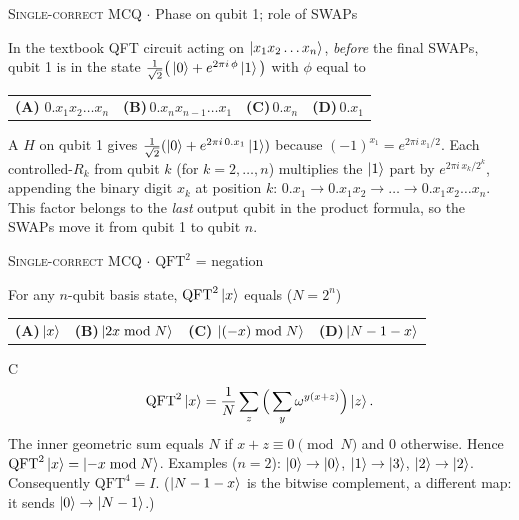 \documentclass[11pt,a4paper]{article}
\newcommand{\optlabel}[1]{\textbf{(#1)}}
\newcommand{\correctlabel}[1]{\textcolor{okgreen}{\textbf{(#1)}\,\ding{51}}}
\newenvironment{qitem}[1]{\begin{list}{}{\setlength{\leftmargin}{3.3em}\setlength{\labelwidth}{3.1em}%
  \setlength{\labelsep}{0.2em}\setlength{\topsep}{3pt}\setlength{\parsep}{3pt}}\item[\textbf{Q.#1}\hfill]}{\end{list}}
\newcommand{\qsep}{\par\vspace{2pt}{\color{black!15}\hrule}\vspace{4pt}}
\newcommand{\qmeta}[2]{{\footnotesize\color{black!60}\textsc{#1} \;$\cdot$\; #2}\par}
\begin{document}
\begin{qitem}{47}
\qmeta{Single-correct MCQ}{Phase on qubit 1; role of SWAPs}
In the textbook QFT circuit acting on $\ket{x_1x_2\dots x_n}$, \emph{before} the final SWAPs, qubit 1 is in the state
$\frac{1}{\sqrt2}\big(\ket0 + e^{2\pi i\,\phi}\ket1\big)$ with $\phi$ equal to
\par\smallskip\noindent\begin{tabularx}{\linewidth}{@{}*{4}{L}@{}}
\correctlabel{A}\,$0.x_1x_2\dots x_n$ & \optlabel{B}\,$0.x_nx_{n-1}\dots x_1$ & \optlabel{C}\,$0.x_n$ & \optlabel{D}\,$0.x_1$
\end{tabularx}
\end{qitem}
\begin{solbox}{A}
$H$ on qubit 1 gives $\frac{1}{\sqrt2}(\ket0 + e^{2\pi i\,0.x_1}\ket1)$ because $(-1)^{x_1} = e^{2\pi i\,x_1/2}$.
Each controlled-$R_k$ from qubit $k$ (for $k = 2, \dots, n$) multiplies the $\ket1$ part by $e^{2\pi i\,x_k/2^k}$, appending the
binary digit $x_k$ at position $k$: $0.x_1 \to 0.x_1x_2 \to \dots \to 0.x_1x_2\dots x_n$.
This factor belongs to the \emph{last} output qubit in the product formula, so the SWAPs move it from qubit 1 to qubit $n$.
\end{solbox}
\qsep

\begin{qitem}{48}
\qmeta{Single-correct MCQ}{$\mathrm{QFT}^2$ = negation}
For any $n$-qubit basis state, $\mathrm{QFT}^2\ket{x}$ equals ($N = 2^n$)
\par\smallskip\noindent\begin{tabularx}{\linewidth}{@{}*{4}{L}@{}}
\optlabel{A}\,$\ket{x}$ & \optlabel{B}\,$\ket{2x \bmod N}$ & \correctlabel{C}\,$\ket{(-x) \bmod N}$ & \optlabel{D}\,$\ket{N - 1 - x}$
\end{tabularx}
\end{qitem}
\begin{solbox}{C}
\[ \mathrm{QFT}^2\ket x = \frac{1}{N}\sum_{z}\Big(\sum_y \omega^{y(x+z)}\Big)\ket z . \]
The inner geometric sum equals $N$ if $x + z \equiv 0 \pmod N$ and $0$ otherwise. Hence $\mathrm{QFT}^2\ket x = \ket{-x \bmod N}$.
Examples ($n = 2$): $\ket0 \to \ket0$, $\ket1 \to \ket3$, $\ket2 \to \ket2$. Consequently $\mathrm{QFT}^4 = I$.
($\ket{N-1-x}$ is the bitwise complement, a different map: it sends $\ket0 \to \ket{N-1}$.)
\end{solbox}
\qsep
\end{document}
